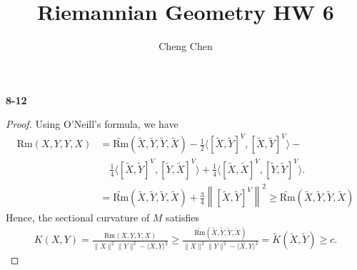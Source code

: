 \documentclass[11pt, a4paper]{article}
\title{Riemannian Geometry HW 6}
\author{Cheng Chen}
\date{}
\theoremstyle{plain}
\theoremstyle{definition}
\theoremstyle{remark}
\begin{document}
\maketitle
\noindent\textbf{8-12}
\newcommand{\hlf}{\frac{1}{2}}
\newcommand{\qud}{\frac{1}{4}}
{
\newcommand{\Rm}[2]{\text{Rm}(#1, #2,#2,#1)}
\newcommand{\trm}[2]{\widetilde{\text{Rm}}(\tilde #1, \tilde #2,\tilde #2,\tilde #1)}
\newcommand{\aaa}[4]{\langle [\tilde#1,\tilde#2]^V,[\tilde#3,\tilde#4]^V\rangle}
\newcommand{\nm}[1]{\left\|#1\right\|}
\newcommand{\td}{\tilde}
\begin{proof}
    Using O'Neill's formula, we have
    \begin{align*}
        \Rm{X}{Y} &= \trm{X}{Y} - \hlf \aaa{X}{Y}{X}{Y} - \\
        &\quad \qud \aaa{X}{Y}{Y}{X} + \qud \aaa{X}{X}{Y}{Y}.\\
        &= \trm{X}{Y} + \frac{3}{4}\nm{[\td X,\td Y]^V}^2 \ge \trm{X}{Y}
    \end{align*}
    Hence, the sectional curvature of $M$ satisfies
    \begin{align*}
        K(X,Y) = \frac{\Rm{X}{Y}}{\|X\|^2\|Y\|^2 - \langle X,Y\rangle^2} \ge \frac{\trm{X}{Y}}{\|X\|^2\|Y\|^2 - \langle X,Y\rangle^2} = \tilde K(\tilde X, \tilde Y) \ge c.
    \end{align*}
\end{proof}
}
\end{document}
